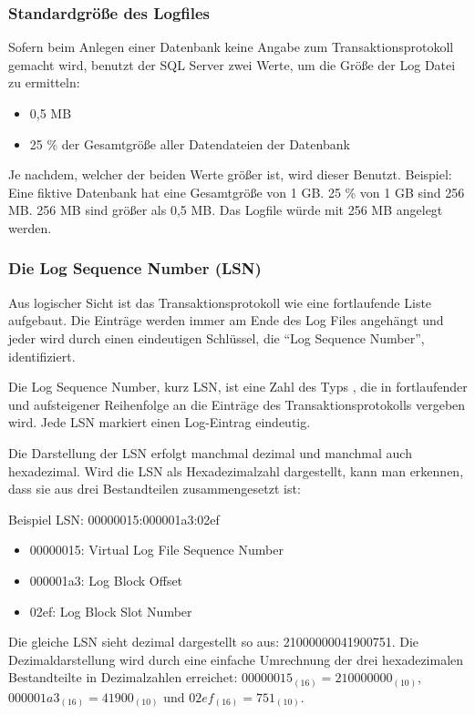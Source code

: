         \subsubsection{Standardgröße des Logfiles}
          Sofern beim Anlegen einer Datenbank keine Angabe zum
          Transaktionsprotokoll gemacht wird, benutzt der SQL Server zwei Werte,
          um die Größe der Log Datei zu ermitteln:
          \begin{itemize}
              \item 0,5 MB
              \item 25 \% der Gesamtgröße aller Datendateien der Datenbank
          \end{itemize}
          Je nachdem, welcher der beiden Werte größer ist, wird dieser Benutzt.
          Beispiel: Eine fiktive Datenbank hat eine Gesamtgröße von 1 GB. 25 \%
          von 1 GB sind 256 MB. 256 MB sind größer als 0,5 MB. Das Logfile würde
          mit 256 MB angelegt werden.
          \begin{literaturinternet}
            \item \cite{PSRSsIVsnadlfs}
          \end{literaturinternet}
        \subsubsection{Die Log Sequence Number (LSN)}
          Aus logischer Sicht ist das Transaktionsprotokoll wie eine
          fortlaufende Liste aufgebaut. Die Einträge werden immer am Ende des
          Log Files angehängt und jeder wird durch einen eindeutigen
          Schlüssel, die \enquote{Log Sequence Number}, identifiziert.
  
          Die Log Sequence Number, kurz LSN, ist eine Zahl des Typs
          , die in fortlaufender und aufsteigener
          Reihenfolge an die Einträge des Transaktionsprotokolls vergeben wird.
          Jede LSN markiert einen Log-Eintrag eindeutig.
          
          Die Darstellung der LSN erfolgt manchmal dezimal und manchmal auch
          hexadezimal. Wird die LSN als Hexadezimalzahl dargestellt, kann man
          erkennen, dass sie aus drei Bestandteilen zusammengesetzt ist:
          
          Beispiel LSN: 00000015:000001a3:02ef
          \begin{itemize}
              \item 00000015: Virtual Log File Sequence Number
              \item 000001a3: Log Block Offset
              \item 02ef: Log Block Slot Number
          \end{itemize}
          Die gleiche LSN sieht dezimal dargestellt so aus: 21000000041900751. Die
          Dezimaldarstellung wird durch eine einfache Umrechnung der drei
          hexadezimalen Bestandteilte in Dezimalzahlen erreichet:
          $00000015_{(16)}=210000000_{(10)}$, $000001a3_{(16)}=41900_{(10)}$
          und $02ef_{(16)}=751_{(10)}$.
